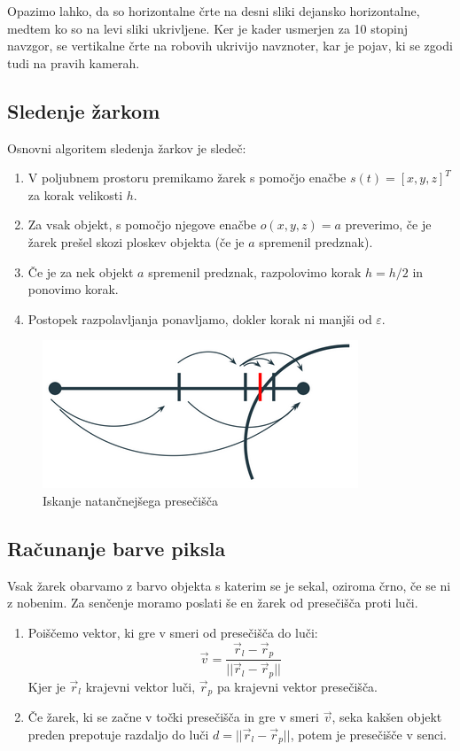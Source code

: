 \documentclass[titlepage]{article}
\begin{document}
Opazimo lahko, da so horizontalne črte na desni sliki dejansko horizontalne, medtem ko so na levi sliki 
ukrivljene. Ker je kader usmerjen za 10 stopinj navzgor, se vertikalne črte na robovih ukrivijo navznoter, 
kar je pojav, ki se zgodi tudi na pravih kamerah.


\subsection{Sledenje žarkom}
Osnovni algoritem sledenja žarkov je sledeč:

\begin{enumerate}
\item V poljubnem prostoru premikamo žarek s pomočjo enačbe \( s(t) = [x, y, z]^T \) za korak velikosti $h$.
\item Za vsak objekt, s pomočjo njegove enačbe \( o(x, y, z) = a \) preverimo, če je žarek prešel skozi ploskev 
objekta (če je \( a \) spremenil predznak).
\item Če je za nek objekt \( a \) spremenil predznak, razpolovimo korak \( h = h/2 \) in ponovimo korak.
\item Postopek razpolavljanja ponavljamo, dokler korak ni manjši od \( \varepsilon \).
\end{enumerate}

\begin{figure}[H]
  \centering
  \includegraphics[width=0.5\linewidth]{intersect.png}
  \caption{Iskanje natančnejšega presečišča}
  \label{Slika:Iskanje natančnejšega presečišča}
\end{figure}

\subsection{Računanje barve piksla}
Vsak žarek obarvamo z barvo objekta s katerim se je sekal, oziroma črno, če se ni z nobenim. Za senčenje moramo
poslati še en žarek od presečišča proti luči. 
\begin{enumerate}
  \item Poiščemo vektor, ki gre v smeri od presečišča do luči: 
  \[ \vec{v} = \frac{\vec{r}_{l} - \vec{r}_{p}}{||\vec{r}_{l} - \vec{r}_{p}||} \]
  Kjer je \( \vec{r}_{l} \) krajevni vektor luči, \( \vec{r}_{p} \) pa krajevni vektor presečišča.
\item Če žarek, ki se začne v točki presečišča in gre v smeri \( \vec{v} \), seka kakšen objekt preden 
    prepotuje razdaljo do luči 
  \( d = ||\vec{r}_{l} - \vec{r}_{p}||\), potem je presečišče v senci.
\end{enumerate}
\end{document}
